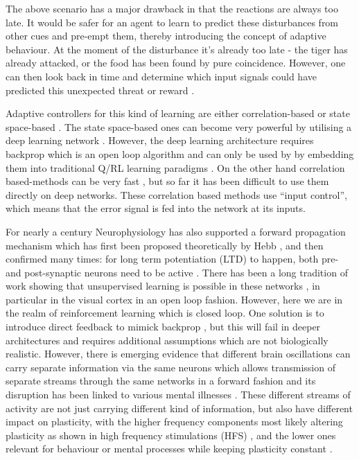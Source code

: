 \documentclass{aamas2018}
\begin{document}
The above scenario has a major drawback in that the reactions are
always too late. It would be safer for an agent to learn to predict
these disturbances from other cues and pre-empt them, thereby
introducing the concept of adaptive behaviour. At the moment of the
disturbance it's already too late - the tiger has already attacked, or
the food has been found by pure coincidence. However, one can then
look back in time and determine which input signals could have
predicted this unexpected threat or reward
\cite{Sutton87,Sutton98,Abbott01,NIPS2002_2245,PorrNecoInvco2003}.

Adaptive controllers for this kind of learning are either
correlation-based \cite{Klopf86,PorrNecoISO2003,Verschure91} or state
space-based \cite{Dayan1992,Sutton98}. The state space-based ones can
become very powerful by utilising a deep learning network
\cite{Guo2014}. However, the deep learning architecture requires backprop which
is an open loop algorithm and can only be used by
by embedding them into traditional Q/RL learning
paradigms \cite{Dayan1992,Guo2014}. On the other hand correlation
based-methods can be very fast \cite{Porr2006ICO}, but so far it has
been difficult to use them directly on deep networks. These
correlation based methods use ``input control'', which means that the
error signal is fed into the network at its inputs.

For nearly a century Neurophysiology has also supported a forward
propagation mechanism which has first been proposed theoretically by
Hebb \cite{Hebb49}, and then confirmed many times: for long term
potentiation (LTD) to happen, both pre- and post-synaptic neurons need
to be active \cite{Luescher2012}.  There has been a long tradition of
work showing that unsupervised learning is possible in these networks
\cite{Linsker88}, in particular in the visual cortex \cite{Miller00}
in an open loop fashion. However, here we are in the realm of
reinforcement learning which is closed loop. One solution is to
introduce direct feedback to mimick backprop \cite{Lillicrap2016}, but
this will fail in deeper architectures and requires additional
assumptions which are not biologically realistic.  However, there is
emerging evidence that different brain oscillations can carry separate
information via the same neurons which allows transmission of separate
streams through the same networks in a forward fashion
\cite{Mizuhara2007,Canolty2010} and its disruption has been linked to
various mental illnesses \cite{Kim2016,Won2017}. These different
streams of activity are not just carrying different kind of
information, but also have different impact on plasticity, with the
higher frequency components most likely altering plasticity as shown
in high frequency stimulations (HFS) \cite{Bliss73}, and the lower
ones relevant for behaviour or mental processes while keeping
plasticity constant \cite{Mizuhara2007}.
\end{document}
